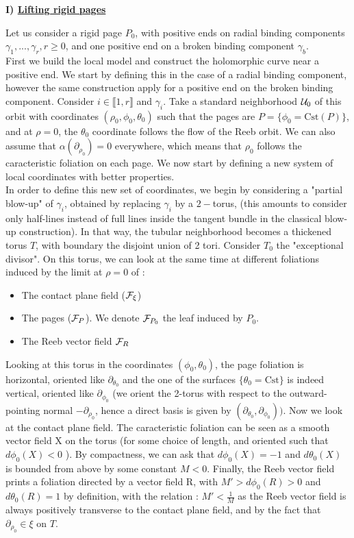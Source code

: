 \documentclass[../main.tex]{subfiles}
\begin{document}
\textbf{I) \underline{Lifting rigid pages}}
\newline

Let us consider a rigid page $P_0$, with positive ends on radial binding components $\gamma_1,...,\gamma_r, r \geq 0$, and one positive end on a broken binding component $\gamma_b$. \\

First we build the local model and construct the holomorphic curve near a positive end. We start by defining this in the case of a radial binding component, however the same construction apply for a positive end on the broken binding component. Consider $i\in\llbracket 1,r\rrbracket$ and $\gamma_i$. Take a standard neighborhood $\mathcal{U}_0$ of this orbit with coordinates $(\rho_0,\phi_0,\theta_0)$ such that the pages are $P = \{\phi_0 = \text{Cst}(P)\}$, and at $\rho = 0$, the $\theta_0$ coordinate follows the flow of the Reeb orbit. We can also assume that $\alpha(\partial_{\rho_0})= 0$ everywhere, which means that $\rho_0$ follows the caracteristic foliation on each page. We now start by defining a new system of local coordinates with better properties. \\


In order to define this new set of coordinates, we begin by considering a "partial blow-up" of $\gamma_i$, obtained by replacing $\gamma_i$ by a $2-$torus, (this amounts to consider only half-lines instead of full lines inside the tangent bundle in the classical blow-up construction). In that way, the tubular neighborhood becomes a thickened torus $T$, with boundary the disjoint union of 2 tori. Consider $T_0$ the "exceptional divisor". On this torus, we can look at the same time at different foliations induced by the limit at $\rho = 0$ of :
\begin{itemize}
    \item The contact plane field ($\mathcal{F}_\xi$)
    \item The pages ($\mathcal{F}_P$). We denote $\mathcal{F}_{P_0}$ the leaf induced by $P_0$.
    \item The Reeb vector field $\mathcal{F}_R$
\end{itemize}

Looking at this torus in the coordinates $(\phi_0,\theta_0)$, the page foliation is horizontal, oriented like $\partial_{\theta_{0}}$ and the one of the surfaces $\{\theta_0 =\text{Cst}\}$ is indeed vertical, oriented like $\partial_{\phi_0}$ (we orient the 2-torus with respect to the outward-pointing normal $-\partial_{\rho_0}$, hence a direct basis is given by $(\partial_{\theta_0},\partial_{\phi_0}))$. Now we look at the contact plane field. The caracteristic foliation can be seen as a smooth vector field X on the torus (for some choice of length, and oriented such that $d\phi_0(X) < 0$ ). By compactness, we can ask that $d\phi_0(X) = -1$ and $d\theta_0(X)$ is bounded from above by some constant $M<0$. Finally, the Reeb vector field prints a foliation directed by a vector field R, with $M'>d\phi_0(R) >0$ and $d\theta_0(R) = 1$ by definition, with the relation : $M' < \frac{1}{M}$ as the Reeb vector field is always positively transverse to the contact plane field, and by the fact that $\partial_{\rho_0}\in \xi$ on $T$.\\
\end{document}
